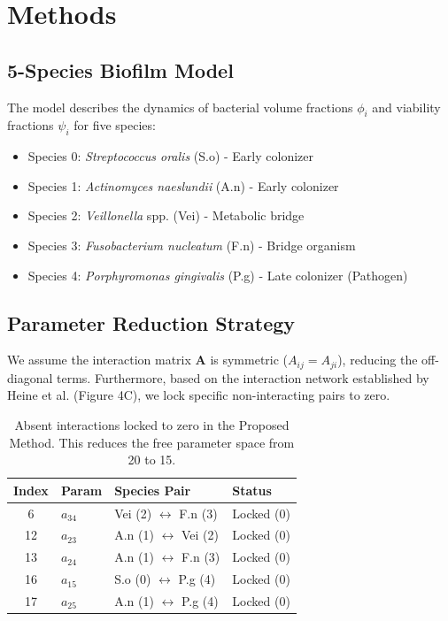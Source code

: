 \documentclass[11pt,a4paper]{article}
\begin{document}
\section{Methods}

\subsection{5-Species Biofilm Model}
The model describes the dynamics of bacterial volume fractions $\phi_i$ and viability fractions $\psi_i$ for five species:
\begin{itemize}
    \item Species 0: \textit{Streptococcus oralis} (S.o) - Early colonizer
    \item Species 1: \textit{Actinomyces naeslundii} (A.n) - Early colonizer
    \item Species 2: \textit{Veillonella} spp. (Vei) - Metabolic bridge
    \item Species 3: \textit{Fusobacterium nucleatum} (F.n) - Bridge organism
    \item Species 4: \textit{Porphyromonas gingivalis} (P.g) - Late colonizer (Pathogen)
\end{itemize}

\subsection{Parameter Reduction Strategy}
We assume the interaction matrix $\mathbf{A}$ is symmetric ($A_{ij} = A_{ji}$), reducing the off-diagonal terms. Furthermore, based on the interaction network established by Heine et al. (Figure 4C), we lock specific non-interacting pairs to zero.

\begin{table}[h]
\centering
\begin{tabular}{clll}
\toprule
\textbf{Index} & \textbf{Param} & \textbf{Species Pair} & \textbf{Status} \\
\midrule
6 & $a_{34}$ & Vei (2) $\leftrightarrow$ F.n (3) & Locked (0) \\
12 & $a_{23}$ & A.n (1) $\leftrightarrow$ Vei (2) & Locked (0) \\
13 & $a_{24}$ & A.n (1) $\leftrightarrow$ F.n (3) & Locked (0) \\
16 & $a_{15}$ & S.o (0) $\leftrightarrow$ P.g (4) & Locked (0) \\
17 & $a_{25}$ & A.n (1) $\leftrightarrow$ P.g (4) & Locked (0) \\
\bottomrule
\end{tabular}
\caption{Absent interactions locked to zero in the Proposed Method. This reduces the free parameter space from 20 to 15.}
\label{tab:locked}
\end{table}
\end{document}
